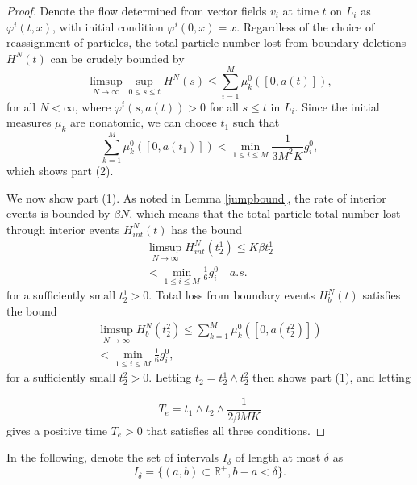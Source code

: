 \begin{proof}
Denote the flow determined from vector fields $v_i$ at time $t$ on $L_i$ as $\varphi^i(t,x)$, with initial condition $\varphi^i(0,x) = x$. Regardless of the choice of reassignment of particles, the total particle number lost  from boundary deletions $H^{N}(t)$ can be crudely bounded by
\begin{equation}
\limsup_{N\rightarrow \infty} \sup_{0\le s\le t}H^N(s) \le \sum_{i = 1}^M \mu_k^0([0,a(t)]), 
\end{equation}
for all $N<\infty$, where $\varphi^i(s,a(t))>0$ for all $s\le t$ in $L_i$.  
Since the initial measures $\mu_k$ are nonatomic, we can choose $t_1$ such that
\begin{equation}\label{massbound}
\sum_{k = 1}^M \mu_k^0([0,a(t_1)])<\min_{1\le i \le M} \frac 1{3M^2 K}g_i^0  ,
\end{equation}
which shows part (2).  

We now show  part (1).  As noted in Lemma \ref{jumpbound}, the rate of interior events is bounded by $\beta N$, which means that the total particle total number lost through interior events $H_{int}^N(t)$ has the bound 
\begin{eqnarray}
\limsup_{N\rightarrow \infty}H_{int}^N(t_2^1) \le K\beta t_2^1\\<\min_{1\le i \le M} \frac 1{6}g_i^0 \quad a.s. \nonumber
\end{eqnarray}
for a sufficiently small $t_2^1>0$. Total loss from boundary events $H_{b}^N(t)$ satisfies the bound
\begin{eqnarray}
\limsup_{N\rightarrow \infty}H_{b}^N(t_2^2) \le\sum_{k = 1}^M \mu_k^0([0,a(t_2^{2})])\\<\min_{1\le i \le M} \frac 1{6}g_i^0, \nonumber
\end{eqnarray}  
for a sufficiently small $t_2^2>0$.  Letting $t_2 = t_2^1 \wedge t_2^2$ then shows part (1), and letting 
  
\begin{equation}
T_{e}=t_1\wedge t_2 \wedge \frac{1}{2\beta MK} 
\end{equation}
gives a positive time $T_e>0$ that satisfies all three conditions.
\end{proof}

In the following, denote the set of intervals $I_\delta$ of  length at most $\delta$ as
\begin{equation}
I_\delta = \{(a,b)\subset \mathbb{R}^+, b-a<\delta\}.
\end{equation}


